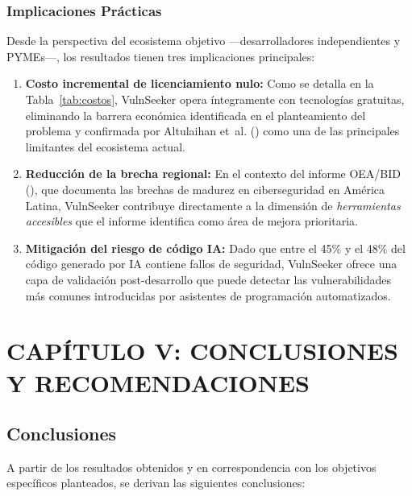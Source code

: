 \documentclass[12pt, a4paper]{article}
\begin{document}
\subsubsection{Implicaciones Prácticas}

Desde la perspectiva del ecosistema objetivo ---desarrolladores
independientes y PYMEs---, los resultados tienen tres implicaciones
principales:

\begin{enumerate}
    \item \textbf{Costo incremental de licenciamiento nulo:} Como se detalla en la
    Tabla~\ref{tab:costos}, VulnSeeker opera íntegramente con
    tecnologías gratuitas, eliminando la barrera económica identificada
    en el planteamiento del problema y confirmada por Altulaihan et~al.
    (\citeyear*{altulaihan2023}) como una de las principales limitantes
    del ecosistema actual.

    \item \textbf{Reducción de la brecha regional:} En el contexto
    del informe OEA/BID (\cite{oasidb2025}), que documenta las brechas
    de madurez en ciberseguridad en América Latina, VulnSeeker contribuye
    directamente a la dimensión de \textit{herramientas accesibles} que
    el informe identifica como área de mejora prioritaria.

    \item \textbf{Mitigación del riesgo de código IA:} Dado que entre
    el 45\% y el 48\% del código generado por IA contiene fallos de
    seguridad, VulnSeeker ofrece una capa de validación post-desarrollo
    que puede detectar las vulnerabilidades más comunes introducidas por
    asistentes de programación automatizados.
\end{enumerate}

\newpage
\section{CAPÍTULO V: CONCLUSIONES Y RECOMENDACIONES}

\subsection{Conclusiones}

A partir de los resultados obtenidos y en correspondencia con los objetivos
específicos planteados, se derivan las siguientes conclusiones:
\end{document}
